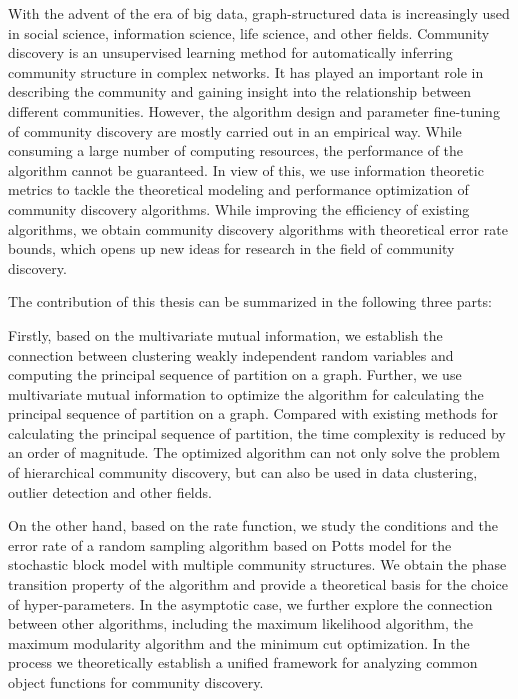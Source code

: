 \begin{abstract*}
  With the advent of the era of big data, graph-structured data is increasingly used in
  social science, information science, life science, and other fields.
  Community discovery is an unsupervised learning method for automatically inferring community structure
  in complex networks.
  It has played an important role in describing the community and gaining insight into the relationship between different communities.
  However, the algorithm design and parameter fine-tuning of community discovery are mostly carried out in an empirical way.
  While consuming a large number of computing resources,
  the performance of the algorithm cannot be guaranteed.
  In view of this,
  we use information theoretic metrics to tackle the theoretical modeling and performance optimization of community discovery algorithms.
  While improving the efficiency of existing algorithms, we obtain community discovery algorithms with theoretical error rate bounds,
  which opens up new ideas for research in the field of community discovery.

  The contribution of this thesis can be summarized in the following three parts:

  Firstly, based on the multivariate mutual information,
  we establish the connection between clustering weakly independent random variables and computing the principal sequence of partition
  on a graph.
  Further, we use multivariate mutual information to optimize the algorithm for calculating the principal sequence of partition on a graph.
  Compared with existing methods for calculating the principal sequence of partition,
  the time complexity is reduced by an order of magnitude.
  The optimized algorithm can not only solve the problem of hierarchical community discovery, but can also be used in data clustering, outlier detection and other fields.

  On the other hand, based on the rate function,
  we study the conditions and the error rate of a random sampling algorithm based on Potts model
  for the stochastic block model with multiple community structures.
  We obtain the phase transition property of the algorithm and provide a theoretical basis
  for the choice of hyper-parameters.
  In the asymptotic case, we further explore the connection between other algorithms, including the maximum likelihood algorithm, the maximum modularity algorithm and the minimum cut optimization.
  In the process we theoretically establish a unified framework for analyzing common object functions for community discovery.


\end{abstract*}
